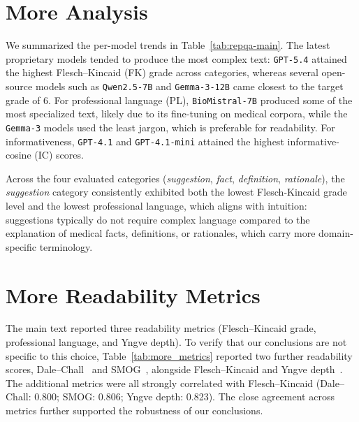 \section{More Analysis}
\label{app:exp1_analysis}
We summarized the per-model trends in Table~\ref{tab:repqa-main}.
The latest proprietary models tended to produce the most complex text: \texttt{GPT-5.4} attained the highest Flesch--Kincaid (FK) grade across categories, whereas several open-source models such as \texttt{Qwen2.5-7B} and \texttt{Gemma-3-12B} came closest to the target grade of $6$.
For professional language (PL), \texttt{BioMistral-7B} produced some of the most specialized text, likely due to its fine-tuning on medical corpora, while the \texttt{Gemma-3} models used the least jargon, which is preferable for readability.
For informativeness, \texttt{GPT-4.1} and \texttt{GPT-4.1-mini} attained the highest informative-cosine (IC) scores.

Across the four evaluated categories (\textit{suggestion}, \textit{fact}, \textit{definition}, \textit{rationale}), the \textit{suggestion} category consistently exhibited both the lowest Flesch-Kincaid grade level and the lowest professional language, which aligns with intuition: suggestions typically do not require complex language compared to the explanation of medical facts, definitions, or rationales, which carry more domain-specific terminology.

\section{More Readability Metrics}
\label{app:more_metrics}
The main text reported three readability metrics (Flesch--Kincaid grade, professional language, and Yngve depth). To verify that our conclusions are not specific to this choice, Table~\ref{tab:more_metrics} reported two further readability scores, Dale–Chall~\citep{tanprasert2021flesch} and SMOG~\citep{mc1969smog}, alongside Flesch--Kincaid and Yngve depth~\citep{yngve1960model}. The additional metrics were all strongly correlated with Flesch–Kincaid (Dale–Chall: 0.800; SMOG: 0.806; Yngve depth: 0.823). The close agreement across metrics further supported the robustness of our conclusions.

